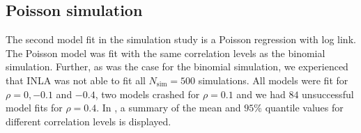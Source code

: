 \subsection{Poisson simulation}
The second model fit in the simulation study is a Poisson regression with log link. The Poisson model was fit with the same correlation levels as the binomial simulation. Further, as was the case for the binomial simulation, we experienced that INLA was not able to fit all $N_{\text{sim}}=500$ simulations. All models were fit for $\rho=0, -0.1$ and $-0.4$, two models crashed for $\rho=0.1$ and we had $84$ unsuccessful model fits for $\rho=0.4$. In , a summary of the mean and $95\%$ quantile values for different correlation levels is displayed.
